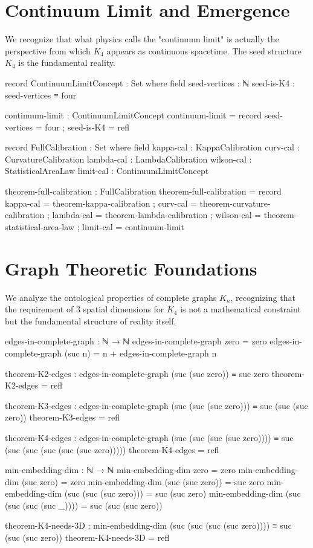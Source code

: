 \documentclass[11pt,a4paper]{book}
\begin{document}
\section{Continuum Limit and Emergence}

We recognize that what physics calls the "continuum limit" is actually the perspective from which $K_4$ appears as continuous spacetime. The seed structure $K_4$ is the fundamental reality.

\begin{code}
record ContinuumLimitConcept : Set where
  field
    seed-vertices : ℕ
    seed-is-K4 : seed-vertices ≡ four
    
continuum-limit : ContinuumLimitConcept
continuum-limit = record
  { seed-vertices = four
  ; seed-is-K4 = refl
  }

record FullCalibration : Set where
  field
    kappa-cal   : KappaCalibration
    curv-cal    : CurvatureCalibration
    lambda-cal  : LambdaCalibration
    wilson-cal  : StatisticalAreaLaw
    limit-cal   : ContinuumLimitConcept

theorem-full-calibration : FullCalibration
theorem-full-calibration = record
  { kappa-cal   = theorem-kappa-calibration
  ; curv-cal    = theorem-curvature-calibration
  ; lambda-cal  = theorem-lambda-calibration
  ; wilson-cal  = theorem-statistical-area-law
  ; limit-cal   = continuum-limit
  }
\end{code}

\section{Graph Theoretic Foundations}

We analyze the ontological properties of complete graphs $K_n$, recognizing that the requirement of 3 spatial dimensions for $K_4$ is not a mathematical constraint but the fundamental structure of reality itself.

\begin{code}
edges-in-complete-graph : ℕ → ℕ
edges-in-complete-graph zero = zero
edges-in-complete-graph (suc n) = n + edges-in-complete-graph n

theorem-K2-edges : edges-in-complete-graph (suc (suc zero)) ≡ suc zero
theorem-K2-edges = refl

theorem-K3-edges : edges-in-complete-graph (suc (suc (suc zero))) ≡ suc (suc (suc zero))
theorem-K3-edges = refl

theorem-K4-edges : edges-in-complete-graph (suc (suc (suc (suc zero)))) ≡ 
                   suc (suc (suc (suc (suc (suc zero)))))
theorem-K4-edges = refl

min-embedding-dim : ℕ → ℕ
min-embedding-dim zero = zero
min-embedding-dim (suc zero) = zero
min-embedding-dim (suc (suc zero)) = suc zero
min-embedding-dim (suc (suc (suc zero))) = suc (suc zero)
min-embedding-dim (suc (suc (suc (suc _)))) = suc (suc (suc zero))

theorem-K4-needs-3D : min-embedding-dim (suc (suc (suc (suc zero)))) ≡ suc (suc (suc zero))
theorem-K4-needs-3D = refl

\end{code}
\end{document}
